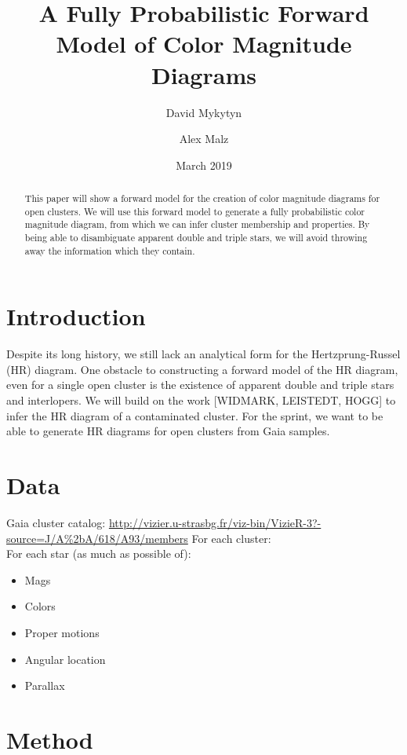 \documentclass{article}
\title{A Fully Probabilistic Forward Model of Color Magnitude Diagrams}
\author{David Mykytyn \and Alex Malz}
\date{March 2019}
\begin{document}
\maketitle

\begin{abstract}
  This paper will show a forward model for the creation of color magnitude diagrams for open clusters. We will use this forward model to generate a fully probabilistic color magnitude diagram, from which we can infer cluster membership and properties. By being able to disambiguate apparent double and triple stars, we will avoid throwing away the information which they contain.

\end{abstract}
  
\section{Introduction}

 Despite its long history, we still lack an analytical form for the Hertzprung-Russel (HR) diagram. 
 One obstacle to constructing a forward model of the HR diagram, even for a single open cluster is the existence of apparent double and triple stars and interlopers. 
 We will build on the work [WIDMARK, LEISTEDT, HOGG] to infer the HR diagram of a contaminated cluster. 
 For the sprint, we want to be able to generate HR diagrams for open clusters from Gaia samples.

\section{Data}

Gaia cluster catalog: \url{http://vizier.u-strasbg.fr/viz-bin/VizieR-3?-source=J/A\%2bA/618/A93/members}
For each cluster:\\
For each star (as much as possible of):
    \begin{itemize}
        \item Mags
        \item Colors
        \item Proper motions
        \item Angular location
        \item Parallax
    \end{itemize}

\section{Method}
\end{document}
